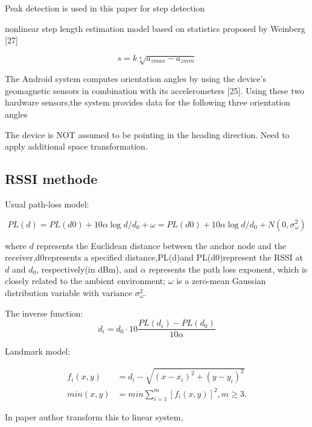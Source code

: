 Peak detection is used in this paper for step detection

nonlinear step length estimation model based on statistics proposed by Weinberg [27]

\begin{equation}
s = k \sqrt[4]{a_{z max} - a_{z min}}
\end{equation}

The Android system computes orientation angles by using the  device’s  geomagnetic  sensors  in  combination  with  its accelerometers   [25].   Using   these   two   hardware   sensors,the  system  provides  data  for  the  following  three  orientation angles

The  device is NOT  assumed to  be pointing in the heading direction. Need to apply additional space transformation.

\subsection{RSSI methode}

Usual path-loss model:

\begin{equation}
PL(d) = PL(d0) + 10 \alpha \log{d / d_0} + \omega = 
PL(d0) + 10 \alpha \log{d / d_0} + N(0, \sigma^2_{\omega})
\end{equation}

where $d$ represents the Euclidean distance between the anchor node  and  the  receiver,d0represents  a  specified  distance,PL(d)and PL(d0)represent the RSSI at $d$ and $d_0$, respectively(in  dBm),  and $\alpha$ represents the  path  loss  exponent, which  is closely related to the ambient environment; $\omega$ is a zero-mean Gaussian distribution variable with variance $\sigma^2_{\omega}$.

The inverse function: 
\begin{equation}
d_i = d_0 \cdot 10 \frac{PL(d_i) - PL(d_0)}{10\alpha}
\end{equation}

Landmark model:

\begin{align}
f_i(x, y) &= d_i - \sqrt{(x - x_i)^2 + (y - y_i)^2} \\
min(x, y) &= min \sum_{i=1}^{m}[f_i(x, y)]^2, m \ge 3.
\end{align}

In paper author transform this to linear system, 

